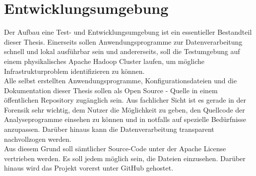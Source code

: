 \clearpage
\section{Entwicklungsumgebung}
\label{development_environment}
Der Aufbau eine Test- und Entwicklungsumgebung ist ein essentieller Bestandteil dieser Thesis. Einerseits sollen Anwendungsprogramme zur Datenverarbeitung schnell und lokal ausführbar sein und andererseits, soll die Testumgebung auf einem physikalisches Apache Hadoop Cluster laufen, um mögliche Infrastrukturproblem identifizieren zu können. \\

\noindent
Alle selbst erstellten Anwendungsprogramme, Konfigurationsdateien und die Dokumentation dieser Thesis sollen als Open Source - Quelle in einem öffentlichen Repository zugänglich sein. Aus fachlicher Sicht ist es gerade in der Forensik sehr wichtig, dem Nutzer die Möglichkeit zu geben, den Quellcode der Analyseprogramme einsehen zu können und in notfalls auf spezielle Bedürfnisse anzupassen. Darüber hinaus kann die Datenverarbeitung transparent nachvollzogen werden.\\

\noindent
Aus diesem Grund soll sämtlicher Source-Code unter der Apache License vertrieben werden. Es soll jedem möglich sein, die Dateien einzusehen. Darüber hinaus wird das Projekt vorerst unter GitHub gehostet.
